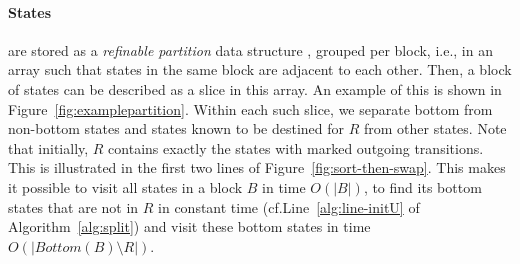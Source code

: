 \documentclass[a4paper,10pt]{article}
\theoremstyle{definition}
\theoremstyle{plain}
\newcommand{\bigo}[1]{{O\!\left(#1\right)}}
\newcommand{\size}[1]{\left\lvert #1 \right\rvert}
\newcommand{\Bottom}{\mathit{Bottom}}
\begin{document}
\paragraph{States}
are stored as a \emph{refinable partition} data structure \cite{ValmariL08},
grouped per block,
i.e., in an array such that states in the same block are adjacent to each other.
Then, a block of states can be described as a slice in this array. An example of this is shown in Figure~\ref{fig:examplepartition}.
Within each such slice, we separate bottom from non-bottom states and states known to be destined for $R$ from other states. Note that initially, $R$ contains exactly the states with marked outgoing transitions. This is illustrated in the first two lines of Figure~\ref{fig:sort-then-swap}.
This makes it possible to visit all states in a block $B$ in time $\bigo{\size{B}}$,
to find its bottom states that are not in $R$ in constant time (cf.\@ Line~\ref{alg:line-initU} of Algorithm~\ref{alg:split}) and visit these bottom states in time $\bigo{\size{\Bottom(B) \setminus R}}$.
\end{document}
